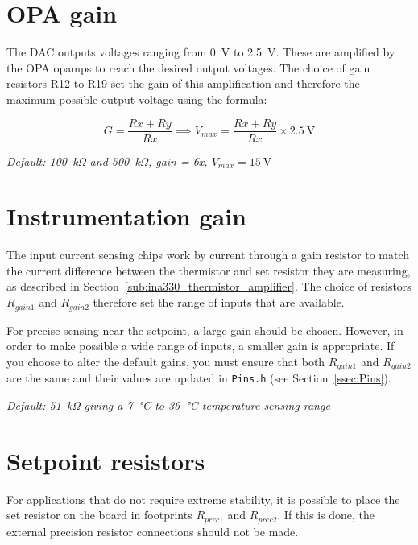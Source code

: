 \documentclass[11pt]{report}
\newcommand{\RGain}{\SI{51}{\kilo\ohm}}
\newcommand{\tempRange}{\SI{7}{\celsius} to \SI{36}{\celsius}}
\begin{document}

\section{OPA gain} %
\label{sub:opa_gain}

The DAC outputs voltages ranging from \SI{0}{\volt} to \SI{2.5}{\volt}. These are amplified by the OPA opamps to reach the desired output voltages. The choice of gain resistors R12 to R19 set the gain of this amplification and therefore the maximum possible output voltage using the formula:

\begin{equation}
\label{eq:OPA_Gain}
G = \frac{Rx + Ry}{Rx} \implies
V_{max} = \frac{Rx + Ry}{Rx} \times \SI{2.5}{\volt}
\end{equation}

\textit{Default: \SI{100}{\kilo\ohm} and \SI{500}{\kilo\ohm}, gain = 6x, $V_{max} =\SI{15}{\volt}$}

\section{Instrumentation gain}

The input current sensing chips work by current through a gain resistor to match the current difference between the thermistor and set resistor they are measuring, as described in Section~\ref{sub:ina330_thermistor_amplifier}. The choice of resistors $R_{gain1}$ and $R_{gain2}$ therefore set the range of inputs that are available. 

For precise sensing near the setpoint, a large gain should be chosen. However, in order to make possible a wide range of inputs, a smaller gain is appropriate. If you choose to alter the default gains, you must ensure that both $R_{gain1}$ and $R_{gain2}$ are the same and their values are updated in {\tt Pins.h} (see Section~\ref{ssec:Pins}). 

\textit{Default: \RGain{} giving a \tempRange{} temperature sensing range}

\section{Setpoint resistors}
\label{sec:setpoint_resistors}

For applications that do not require extreme stability, it is possible to place the set resistor on the board in footprints $R_{prec1}$ and $R_{prec2}$. If this is done, the external precision resistor connections should not be made.
\end{document}
